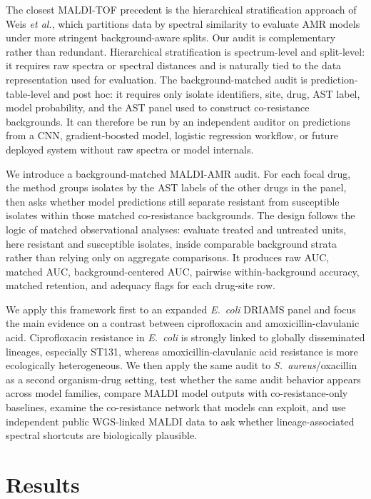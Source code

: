 \documentclass[11pt]{article}
\begin{document}
The closest MALDI-TOF precedent is the hierarchical stratification approach of Weis \textit{et al.}, which partitions data by spectral similarity to evaluate AMR models under more stringent background-aware splits\cite{weis2022stratification}. Our audit is complementary rather than redundant. Hierarchical stratification is spectrum-level and split-level: it requires raw spectra or spectral distances and is naturally tied to the data representation used for evaluation. The background-matched audit is prediction-table-level and post hoc: it requires only isolate identifiers, site, drug, AST label, model probability, and the AST panel used to construct co-resistance backgrounds. It can therefore be run by an independent auditor on predictions from a CNN, gradient-boosted model, logistic regression workflow, or future deployed system without raw spectra or model internals.

We introduce a background-matched MALDI-AMR audit. For each focal drug, the method groups isolates by the AST labels of the other drugs in the panel, then asks whether model predictions still separate resistant from susceptible isolates within those matched co-resistance backgrounds. The design follows the logic of matched observational analyses: evaluate treated and untreated units, here resistant and susceptible isolates, inside comparable background strata rather than relying only on aggregate comparisons\cite{rosenbaum1983propensity}. It produces raw AUC, matched AUC, background-centered AUC, pairwise within-background accuracy, matched retention, and adequacy flags for each drug-site row.

We apply this framework first to an expanded \textit{E.~coli} DRIAMS panel and focus the main evidence on a contrast between ciprofloxacin and amoxicillin-clavulanic acid. Ciprofloxacin resistance in \textit{E.~coli} is strongly linked to globally disseminated lineages, especially ST131, whereas amoxicillin-clavulanic acid resistance is more ecologically heterogeneous\cite{nicolas2014st131}. We then apply the same audit to \textit{S.~aureus}/oxacillin as a second organism-drug setting, test whether the same audit behavior appears across model families, compare MALDI model outputs with co-resistance-only baselines, examine the co-resistance network that models can exploit, and use independent public WGS-linked MALDI data to ask whether lineage-associated spectral shortcuts are biologically plausible.

\section*{Results}
\end{document}
